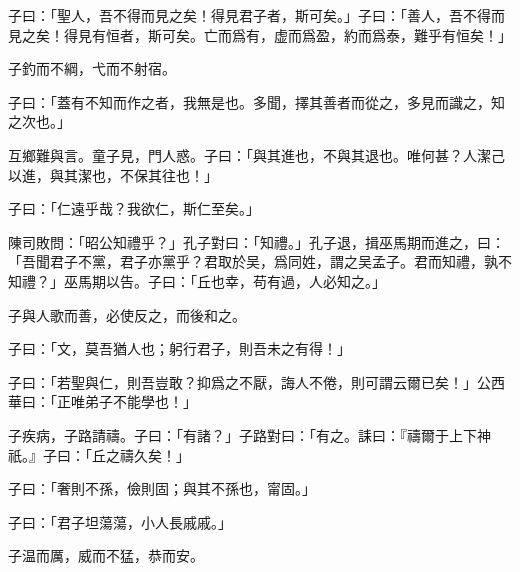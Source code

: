 子曰：「聖人，吾不得而見之矣！得見君子者，斯可矣。」子曰：「善人，吾不得而見之矣！得見有恒者，斯可矣。亡而爲有，虚而爲盈，約而爲泰，難乎有恒矣！」

子釣而不綱，弋而不射宿。

子曰：「蓋有不知而作之者，我無是也。多聞，擇其善者而從之，多見而識之，知之次也。」

互鄉難與言。童子見，門人惑。子曰：「與其進也，不與其退也。唯何甚？人潔己以進，與其潔也，不保其往也！」

子曰：「仁遠乎哉？我欲仁，斯仁至矣。」

陳司敗問：「昭公知禮乎？」孔子對曰：「知禮。」孔子退，揖巫馬期而進之，曰：「吾聞君子不黨，君子亦黨乎？君取於吴，爲同姓，謂之吴孟子。君而知禮，孰不知禮？」巫馬期以告。子曰：「丘也幸，苟有過，人必知之。」

子與人歌而善，必使反之，而後和之。

子曰：「文，莫吾猶人也；躬行君子，則吾未之有得！」

子曰：「若聖與仁，則吾豈敢？抑爲之不厭，誨人不倦，則可謂云爾已矣！」公西華曰：「正唯弟子不能學也！」

子疾病，子路請禱。子曰：「有諸？」子路對曰：「有之。誄曰：『禱爾于上下神祇。』子曰：「丘之禱久矣！」

子曰：「奢則不孫，儉則固；與其不孫也，甯固。」

子曰：「君子坦蕩蕩，小人長戚戚。」

子温而厲，威而不猛，恭而安。
